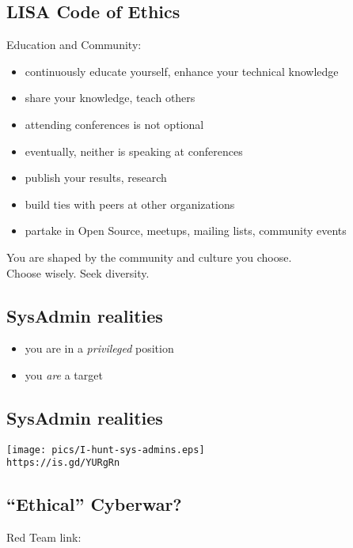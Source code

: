 \documentclass[xga]{xdvislides}
\begin{document}
\subsection{LISA Code of Ethics}
Education and Community:
\begin{itemize}
	\item continuously educate yourself, enhance your technical knowledge
	\item share your knowledge, teach others
	\item attending conferences is not optional
	\item eventually, neither is speaking at conferences
	\item publish your results, research
	\item build ties with peers at other organizations
	\item partake in Open Source, meetups, mailing lists, community events
\end{itemize}
\vspace{.25in}
You are shaped by the community and culture you choose. \\
Choose wisely.  Seek diversity. \\

\subsection{SysAdmin realities}
\begin{itemize}
	\item you are in a {\em privileged} position
	\item you {\em are} a target
\end{itemize}

\subsection{SysAdmin realities}
\begin{center}
	\texttt{[image: pics/I-hunt-sys-admins.eps]} \\
	\small
	{\tt https://is.gd/YURgRn}\hspace{.5in}{\tt https://is.gd/u8ni1B}
	\Normalsize
\end{center}

\subsection{``Ethical'' Cyberwar?}
Red Team link: \\
\end{document}

